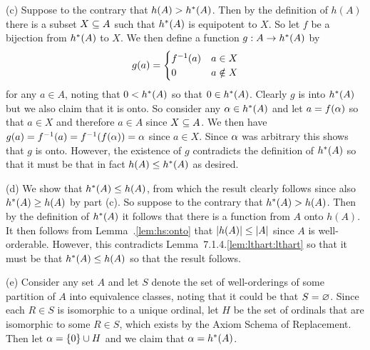 \begin{solution}
    (c) Suppose to the contrary that $h(A) > \hs(A)$.
    Then by the definition of $h(A)$ there is a subset $X \ss A$ such that $\hs(A)$ is equipotent to $X$.
    So let $f$ be a bijection from $\hs(A)$ to $X$.
    We then define a function $g : A \to \hs(A)$ by
    $$
    g(a) = \begin{cases}
         \inv{f}(a) & a \in X \\
         0 & a \notin X
    \end{cases}
    $$
    for any $a \in A$, noting that $0 < \hs(A)$ so that $0 \in \hs(A)$.
    Clearly $g$ is into $\hs(A)$ but we also claim that it is onto.
    So consider any $\a \in \hs(A)$ and let $a = f(\a)$ so that $a \in X$ and therefore $a \in A$ since $X \ss A$.
    We then have $g(a) = \inv{f}(a) = \inv{f}(f(\a)) = \a$ since $a \in X$.
    Since $\a$ was arbitrary this shows that $g$ is onto.
    However, the existence of $g$ contradicts the definition of $\hs(A)$ so that it must be that in fact $h(A) \leq \hs(A)$ as desired. \qedsymbol

    (d) We show that $\hs(A) \leq h(A)$, from which the result clearly follows since also $\hs(A) \geq h(A)$ by part (c).
    So suppose to the contrary that $\hs(A) > h(A)$.
    Then by the definition of $\hs(A)$ it follows that there is a function from $A$ onto $h(A)$.
    It then  follows from Lemma~\ex.\ref{lem:hs:onto} that $\abs{h(A)} \leq \abs{A}$ since $A$ is well-orderable.
    However, this contradicts Lemma~7.1.4.\ref{lem:lthart:lthart} so that it must be that $\hs(A) \leq h(A)$ so that the result follows.

    (e) Consider any set $A$ and let $S$ denote the set of well-orderings of some partition of $A$ into equivalence classes, noting that it could be that $S = \es$.
    Since each $R \in S$ is isomorphic to a unique ordinal, let $H$ be the set of ordinals that are isomorphic to some $R \in S$, which exists by the Axiom Schema of Replacement.
    Then let $\a = \braces{0} \cup H$ and we claim that $\a = \hs(A)$.


\end{solution}
